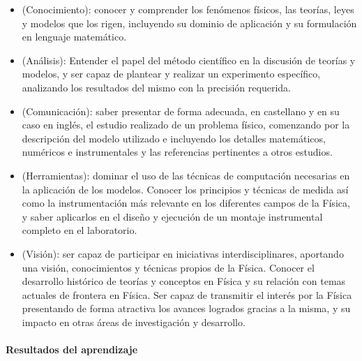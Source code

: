 \begin{itemize}
\item (Conocimiento): conocer y comprender los fenómenos físicos, las teorías, leyes y modelos que los rigen, incluyendo su dominio de aplicación y su formulación en lenguaje matemático.
\item (Análisis): Entender el papel del método científico en la discusión de teorías y modelos, y ser capaz de plantear y realizar un experimento específico, analizando los resultados del mismo con la precisión requerida.
\item (Comunicación): saber presentar de forma adecuada, en castellano y en su caso en inglés, el estudio realizado de un problema físico, comenzando por la descripción del modelo utilizado e incluyendo los detalles matemáticos,
numéricos e instrumentales y las referencias pertinentes a otros estudios.
\item (Herramientas): dominar el uso de las técnicas de computación necesarias en la aplicación de los modelos. Conocer los principios y técnicas de medida así como la instrumentación más relevante en los diferentes campos de la Física, y saber aplicarlos en el diseño y ejecución de un montaje instrumental completo en el laboratorio.
\item (Visión): ser capaz de participar en iniciativas interdisciplinares, aportando una visión, conocimientos y técnicas propios de la Física. Conocer el desarrollo histórico de teorías y conceptos en Física y su relación con temas
actuales de frontera en Física. Ser capaz de transmitir el interés por la Física presentando de forma atractiva los avances logrados gracias a la misma, y su impacto en otras áreas de investigación y desarrollo.
\end{itemize}

\paragraph{Resultados del aprendizaje}

